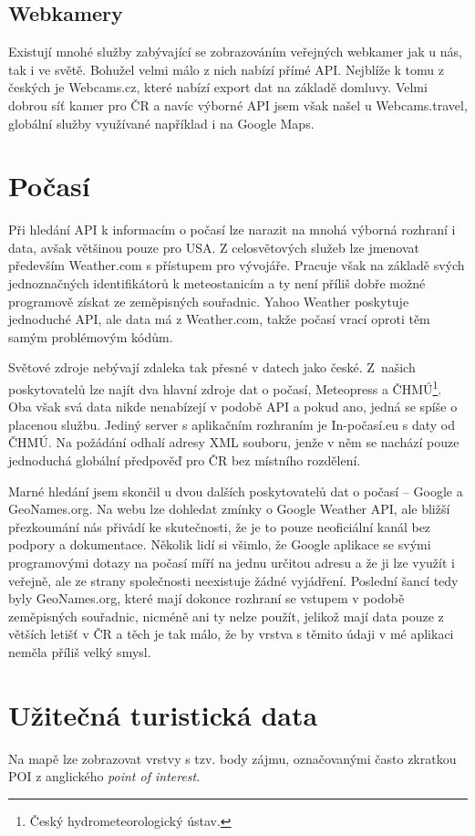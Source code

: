 \subsection{Webkamery}
Existují mnohé služby zabývající se zobrazováním
veřejných webkamer jak u nás, tak i ve světě. Bohužel velmi málo
z nich nabízí přímé API. Nejblíže k tomu z českých je Webcams.cz,
které nabízí export dat na základě domluvy. Velmi dobrou
síť kamer pro ČR a navíc výborné API jsem však našel u
Webcams.travel, globální služby využívané například i na Google
Maps.

\section{Počasí}
Při hledání API k informacím o počasí lze narazit na mnohá výborná
rozhraní i data, avšak většinou pouze pro USA. Z celosvětových služeb
lze jmenovat především Weather.com s přístupem pro vývojáře. Pracuje
však na základě svých jednoznačných identifikátorů k meteostanicím a
ty není příliš dobře možné programově získat ze zeměpisných
souřadnic. Yahoo Weather poskytuje jednoduché API, ale data má z
Weather.com, takže počasí vrací oproti těm samým problémovým kódům.

Světové zdroje nebývají zdaleka tak přesné v datech jako české.
Z~našich poskytovatelů lze najít dva hlavní zdroje dat o počasí,
Meteopress a ČHMÚ\footnote{Český hydrometeorologický ústav.}. Oba
však svá data nikde nenabízejí v podobě API a pokud ano, jedná se
spíše o placenou službu. Jediný server s aplikačním rozhraním je
In-počasí.eu s daty od ČHMÚ. Na požádání odhalí adresy XML souboru,
jenže v něm se nachází pouze jednoduchá globální předpověď pro ČR bez
místního rozdělení.

Marné hledání jsem skončil u dvou dalších poskytovatelů dat o
počasí -- Google a GeoNames.org. Na webu lze dohledat zmínky o Google
Weather API, ale bližší přezkoumání nás přivádí ke skutečnosti, že je
to pouze neoficiální kanál bez podpory a dokumentace. Několik lidí si
všimlo, že Google aplikace se svými programovými dotazy na počasí
míří na jednu určitou adresu a že ji lze využít i veřejně, ale ze
strany společnosti neexistuje žádné vyjádření. Poslední šancí tedy
byly GeoNames.org, které mají dokonce rozhraní se vstupem v podobě
zeměpisných souřadnic, nicméně ani ty nelze použít, jelikož mají data
pouze z větších letišť v ČR a těch je tak málo, že by vrstva s
těmito údaji v mé aplikaci neměla příliš velký smysl. 

\section{Užitečná turistická data}
Na mapě lze zobrazovat vrstvy s tzv. body zájmu, označovanými často
zkratkou POI z anglického {\it point of interest}.

